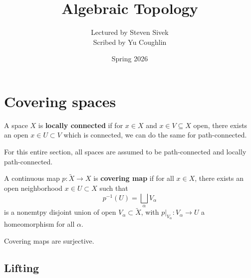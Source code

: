\documentclass{article}
\begin{document}
\title{Algebraic Topology}
\author{Lectured by Steven Sivek \\
Scribed by Yu Coughlin}
\date{Spring 2026}

\maketitle

\tableofcontents

\newpage

\section{Covering spaces}

\begin{definition}
    A space $X$ is \textbf{locally connected} if for $x\in X$ and $x\in V\subseteq X$ open, there exists an open $x\in U\subset V$ which is connected, we can do the same for path-connected.
\end{definition}

For this entire section, all spaces are assumed to be path-connected and locally path-connected.

\begin{definition}
    A continuous map $p:\tilde{X}\rightarrow X$ is \textbf{covering map} if for all $x\in X$, there exists an open neighborhood $x\in U\subset X$ such that \[
    p^{-1}(U) = \bigsqcup_{\alpha}V_\alpha
    \]is a nonemtpy disjoint union of open $V_\alpha\subset \tilde{X}$, with $p\vert_{V_\alpha}:V_\alpha\rightarrow U$ a homeomorphism for all $\alpha$.
\end{definition}

\begin{lemma}
    Covering maps are surjective.
\end{lemma}

\subsection{Lifting}
\end{document}
